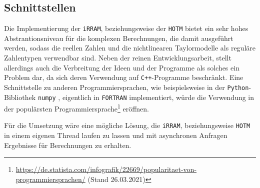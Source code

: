 \subsection{Schnittstellen}
Die Implementierung der \verb+iRRAM+, beziehungsweise der \verb+HOTM+ bietet ein sehr hohes Abstrantionsniveau für die komplexen Berechnungen, die damit ausgeführt werden, sodass die reellen Zahlen und die nichtlinearen Taylormodelle als reguläre Zahlentypen verwendbar sind. Neben der reinen Entwicklungsarbeit, stellt allerdings auch die Verbreitung der Ideen und der Programme als solches ein Problem dar, da sich deren Verwendung auf \verb.C++.-Programme beschränkt. Eine Schnittstelle zu anderen Programmiersprachen, wie beispielsweise in der \verb+Python+-Bibliothek \verb+numpy+ \cite{harris2020array}, eigentlich in \verb+FORTRAN+ implementiert, würde die Verwendung in der populärsten Programmiersprache\footnote{\url{https://de.statista.com/infografik/22669/popularitaet-von-programmiersprachen/} (Stand 26.03.2021)} eröffnen.  


Für die Umsetzung wäre eine mögliche Lösung, die \verb+iRRAM+, beziehungsweise \verb+HOTM+ in einem eigenen Thread laufen zu lassen und mit asynchronen Anfragen Ergebnisse für Berechnungen zu erhalten.


